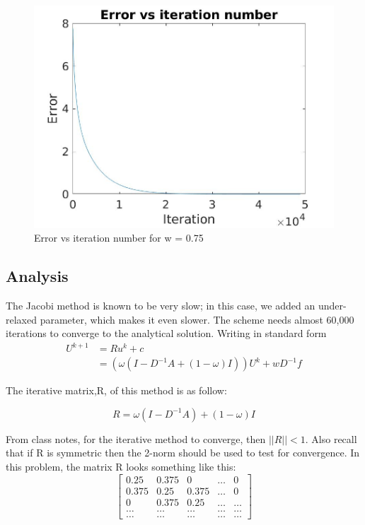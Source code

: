 \documentclass{article}
\begin{document}
\begin{figure}[H]
	\includegraphics[width=\linewidth]{jacobi_error.jpg}	
	
	\caption{Error vs iteration number for w = 0.75}
\end{figure}

\subsection{Analysis}

The Jacobi method is known to be very slow; in this case, we added an under-relaxed parameter, which makes it even slower. The scheme needs almost 60,000 iterations to converge to the analytical solution.  Writing in standard form   
\begin{align*}
	U^{k+1}&=Ru^k+c\\
	&=\left(\omega(I-D^{-1}A+(1-\omega)I)\right)U^{k} + wD^{-1}f
\end{align*}

\noindent
The iterative matrix,R, of this method is as follow: 

\begin{equation}
	R = \omega(I-D^{-1}A)+(1-\omega)I
\end{equation}

\noindent
From class notes, for the iterative method to converge, then $||R|| < 1$. Also recall that if R is symmetric then the 2-norm should be used to test for convergence. In this problem, the matrix R looks something like this: 
\[
\begin{bmatrix}
	0.25 & 0.375 & 0 & \dots & 0 \\
	0.375 & 0.25 & 0.375 & \dots & 0 \\
	0 & 0.375 & 0.25 & \dots & \dots \\
	\dots  & \dots  & \dots  & \dots & \dots  \\
	\dots & \dots & \dots & \dots & \dots 
\end{bmatrix} 
\]
\end{document}
